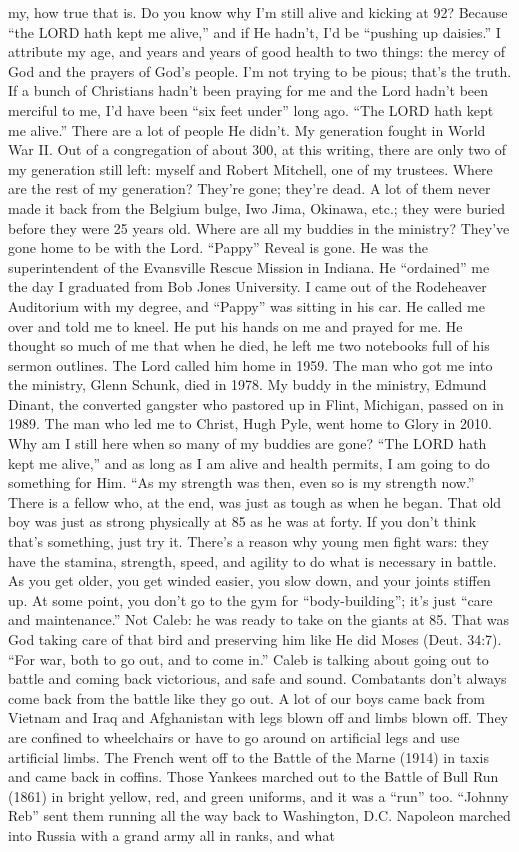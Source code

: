 my, how true that is. Do you know why I’m still alive and kicking at 92? Because “the LORD hath kept me alive,” and if He hadn’t, I’d be “pushing up daisies.” I attribute my age, and years and years of good health to two things: the mercy of God and the prayers of God’s people. I’m not trying to be pious; that’s the truth. If a bunch of Christians hadn’t been praying for me and the Lord hadn’t been merciful to me, I’d have been “six feet under” long ago. “The LORD hath kept me alive.” There are a lot of people He didn’t. My generation fought in World War II. Out of a congregation of about 300, at this writing, there are only two of my generation still left: myself and Robert Mitchell, one of my trustees. Where are the rest of my generation? They’re gone; they’re dead. A lot of them never made it back from the Belgium bulge, Iwo Jima, Okinawa, etc.; they were buried before they were 25 years old. Where are all my buddies in the ministry? They’ve gone home to be with the Lord. “Pappy” Reveal is gone. He was the superintendent of the Evansville Rescue Mission in Indiana. He “ordained” me the day I graduated from Bob Jones University. I came out of the Rodeheaver Auditorium with my degree, and “Pappy” was sitting in his car. He called me over and told me to kneel. He put his hands on me and prayed for me. He thought so much of me that when he died, he left me two notebooks full of his sermon outlines. The Lord called him home in 1959. The man who got me into the ministry, Glenn Schunk, died in 1978. My buddy in the ministry, Edmund Dinant, the converted gangster who pastored up in Flint, Michigan, passed on in 1989. The man who led me to Christ, Hugh Pyle, went home to Glory in 2010. Why am I still here when so many of my buddies are gone? “The LORD hath kept me alive,” and as long as I am alive and health permits, I am going to do something for Him. “As my strength was then, even so is my strength now.” There is a fellow who, at the end, was just as tough as when he began. That old boy was just as strong physically at 85 as he was at forty. If you don’t think that’s something, just try it. There’s a reason why young men fight wars: they have the stamina, strength, speed, and agility to do what is necessary in battle. As you get older, you get winded easier, you slow down, and your joints stiffen up. At some point, you don’t go to the gym for “body-building”; it’s just “care and maintenance.” Not Caleb: he was ready to take on the giants at 85. That was God taking care of that bird and preserving him like He did Moses (Deut. 34:7). “For war, both to go out, and to come in.” Caleb is talking about going out to battle and coming back victorious, and safe and sound. Combatants don’t always come back from the battle like they go out. A lot of our boys came back from Vietnam and Iraq and Afghanistan with legs blown off and limbs blown off. They are confined to wheelchairs or have to go around on artificial legs and use artificial limbs. The French went off to the Battle of the Marne (1914) in taxis and came back in coffins. Those Yankees marched out to the Battle of Bull Run (1861) in bright yellow, red, and green uniforms, and it was a “run” too.  “Johnny Reb” sent them running all the way back to Washington, D.C. Napoleon marched into Russia with a grand army all in ranks, and what 